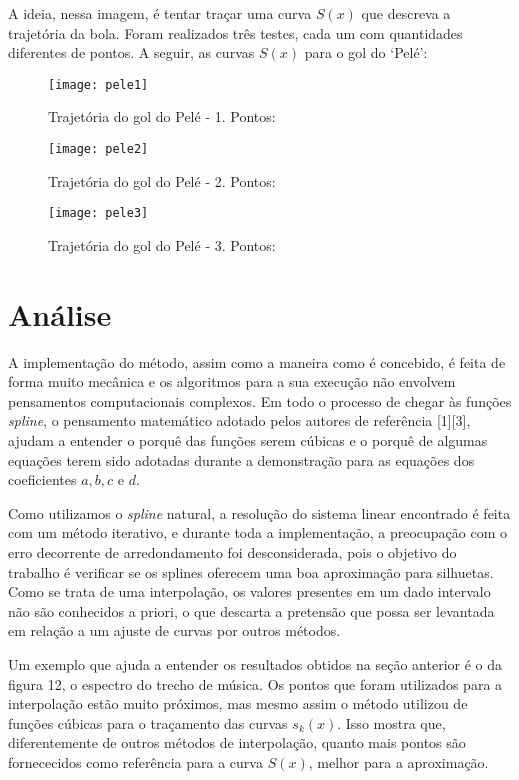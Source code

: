 \documentclass[11pt]{article}
\begin{document}
A ideia, nessa imagem, é tentar traçar uma curva $S(x)$ que descreva
a trajetória da bola. Foram realizados três testes, cada um com quantidades
diferentes de pontos. A seguir, as curvas $S(x)$ para o gol do `Pelé':

\begin{figure}[H]
\centering
\texttt{[image: pele1]}
\caption{Trajetória do gol do Pelé - 1. Pontos: \url{}}
\end{figure}

\begin{figure}[H]
\centering
\texttt{[image: pele2]}
\caption{Trajetória do gol do Pelé - 2. Pontos: \url{}}
\end{figure}

\begin{figure}[H]
\centering
\texttt{[image: pele3]}
\caption{Trajetória do gol do Pelé - 3. Pontos: \url{}}
\end{figure}

\section{Análise}

A implementação do método, assim como a maneira como é concebido,
é feita de forma muito mecânica e os algoritmos para a sua execução
não envolvem pensamentos computacionais complexos. Em todo o processo
de chegar às funções \textit{spline}, o pensamento matemático adotado
pelos autores de referência [1][3], ajudam a entender o porquê
das funções serem cúbicas e o porquê de algumas equações terem sido
adotadas durante a demonstração para as equações dos coeficientes
$a, b, c$ e $d$.

Como utilizamos o \textit{spline} natural, a resolução do sistema
linear encontrado é feita com um método iterativo, e durante
toda a implementação, a preocupação com o erro decorrente de
arredondamento foi desconsiderada, pois o objetivo do trabalho
é verificar se os splines oferecem uma boa aproximação para silhuetas.
Como se trata de uma interpolação, os valores presentes em um dado
intervalo não são conhecidos a priori, o que descarta a pretensão que
possa ser levantada em relação a um ajuste de curvas por outros métodos.

Um exemplo que ajuda a entender os resultados obtidos na seção anterior
é o da figura 12, o espectro do trecho de música. Os pontos que foram
utilizados para a interpolação estão muito próximos, mas mesmo assim
o método utilizou de funções cúbicas para o traçamento das curvas
$s_k(x)$. Isso mostra que, diferentemente de outros métodos de interpolação,
quanto mais pontos são fornececidos como referência para a curva $S(x)$, melhor
para a aproximação.
\end{document}
